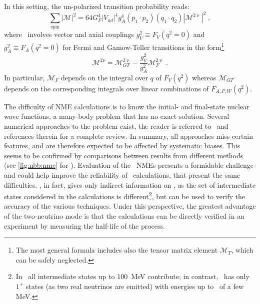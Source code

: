 In this setting, the un-polarized transition probability reads:
\begin{equation}\label{eq:nbb:trans-prob}
  \sum_\text{spin} |\mathcal{M}|^2 = 64 G^4_F |V_{ud}|^4 g^4_A (p_1 \cdot p_2)
                                     (q_1 \cdot q_2) |\mathcal{M}^{2\upnu}|^2 \;,
\end{equation}
where \nmet\ involves vector and axial couplings $g^2_V \equiv F_V(q^2=0)$ and $g^2_A
\equiv F_A(q^2=0)$ for Fermi and Gamow-Teller transitions in the form\footnote{%
  The most general formula includes also the tensor matrix element $\mathcal{M}_T$, which
  can be safely neglected.
}
\[
  \mathcal{M}^{2\nu} = \mathcal{M}^{2\upnu}_{GT} -
                       \frac{g^2_V}{g^2_A} \mathcal{M}^{2\upnu}_F \;.
\]
In particular, $\mathcal{M}_F$ depends on the integral over $q$ of $F_V(q^2)$ whereas
$\mathcal{M}_{GT}$ depends on the corresponding integrals over linear combinations of
$F_{A,P,W}(q^2)$.

The difficulty of NME calculations is to know the initial- and final-state nuclear wave
functions, a many-body problem that has no exact solution. Several numerical approaches to
the problem exist, the reader is referred to~\cite{Engel2017} and references therein for a
complete review. In summary, all approaches miss certain features, and are therefore
expected to be affected by systematic biases. This seems to be confirmed by comparisons
between results from different methods (see \cref{fig:nbb:nme} for \onbb). Evaluation of
the \nnbb\ NMEs presents a formidable challenge and could help improve the reliability of
\nmez\ calculations, that present the same difficulties. \nnbb, in fact, gives only
indirect information on \onbb, as the set of intermediate states considered in the
calculations is different\footnote{%
  In \onbb\ all intermediate states up to 100~MeV contribute; in contrast, \nnbb\ has only
  $1^+$ states (as two real neutrinos are emitted) with energies up to \qbb\ of a few MeV.
}, but can be used to verify the accuracy of the various techniques.  Under this
perspective, the greatest advantage of the two-neutrino mode is that the calculations can
be directly verified in an experiment by measuring the half-life of the process.

